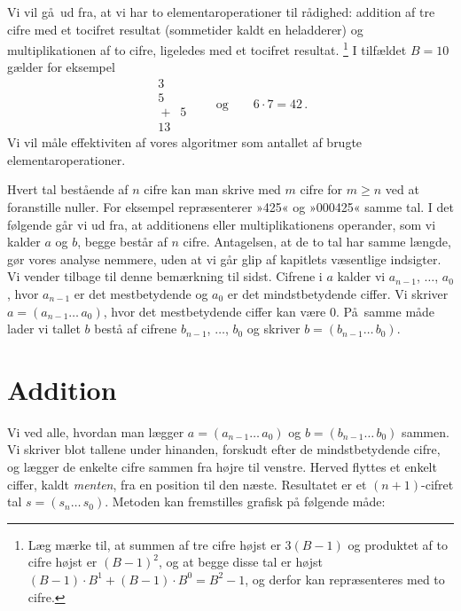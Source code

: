 Vi vil gå ud fra, at vi har to elementaroperationer til rådighed:
addition af tre cifre med et tocifret resultat (sommetider kaldt en heladderer)
og multiplikationen af to cifre, ligeledes med et tocifret resultat.%
\footnote{Læg mærke til, at summen af tre cifre højst er $3(B - 1)$ og produktet af to cifre højst er $(B-1)^2$, og at begge disse tal er højst $(B-1)\cdot B^1 + (B - 1)\cdot B^0 = B^2 - 1$, og derfor kan repræsenteres med to cifre.}
I tilfældet $B=10$ gælder for eksempel
\[  \begin{array}{r} 3 \\ 5 \\ {}+{}\;\;5 \\ \hline 13 \end{array}
\qquad\text{og}\qquad    6 \cdot 7 = 42 \,. \]
Vi vil måle effektiviten af vores algoritmer som antallet af brugte elementaroperationer.

Hvert tal bestående af $n$ cifre kan man skrive med $m$ cifre for $m \ge n$ ved at foranstille nuller.
For eksempel repræsenterer »425« og »000425« samme tal. 
I det følgende går vi ud fra, at additionens eller multiplikationens operander, som vi kalder $a$ og $b$, begge består af $n$ cifre.
Antagelsen, at de to tal har samme længde, gør vores analyse nemmere, uden at vi går glip af kapitlets væsentlige indsigter.
Vi vender tilbage til denne bemærkning til sidst.
Cifrene i $a$ kalder vi $a_{n-1}$, $\ldots$, $a_0$, hvor $a_{n-1}$ er det mestbetydende og $a_0$  er det mindstbetydende ciffer.
Vi skriver $a = (a_{n-1}\ldots\,a_0)$, hvor det mestbetydende ciffer kan være 0.
På samme måde lader vi tallet $b$ bestå af cifrene $b_{n-1}$, $\ldots$, $b_0$ og skriver $b =(b_{n-1}\ldots\,b_0)$.


\section{Addition}

Vi ved alle, hvordan man lægger
$a = (a_{n-1}\ldots\,a_0)$ og $b = (b_{n-1}\ldots\,b_0)$ sammen.
Vi skriver blot tallene under hinanden, forskudt efter de mindstbetydende cifre, og lægger de enkelte cifre sammen fra højre til venstre.
Herved flyttes et enkelt ciffer, kaldt \emph{menten},
fra en position til den næste.
Resultatet er et $(n+1)$-cifret tal $s=(s_n\ldots\,s_0)$.
Metoden kan fremstilles grafisk på følgende måde:


